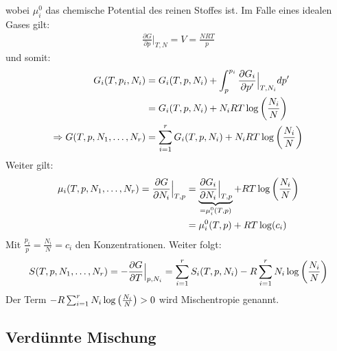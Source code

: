 wobei $\mu_i^0$ das chemische Potential des reinen Stoffes ist.
Im Falle eines idealen Gases gilt:
\begin{align*}
    \frac{\partial G}{\partial p} \Big|_{T,N} = V = \frac{N R T}{p}
\end{align*}
und somit:
\begin{align*}
    G_i(T,p_i,N_i) &= G_i (T,p,N_i) + \int_{p}^{p_i} \frac{\partial G_i}{\partial p'} \Big|_{T,N_i} dp'
    \\
    &= G_i (T,p,N_i) + N_i R T \log \left( \frac{N_i}{N} \right)
    \\
    \Rightarrow
    G(T,p,N_1,\dots,N_r) &= \sum_{i=1}^r G_i (T,p,N_i) + N_i R T \log \left( \frac{N_i}{N} \right)
\end{align*}
Weiter gilt:
\begin{align*}
    \mu_i(T,p,N_1,\dots,N_r) = \frac{\partial G}{\partial N_i} \Big|_{T,p}
    &= \underbrace{\frac{\partial G_i}{\partial N_i} \Big|_{T,p}}_{=\mu_i^0 (T,p)}
        + R T \log \left( \frac{N_i}{N} \right)
    \\
    &= \mu_i^0 (T,p) + R T \log(c_i)
\end{align*}
Mit $\frac{p_i}{p} = \frac{N_i}{N} = c_i$ den Konzentrationen.
Weiter folgt:
\begin{align*}
    S(T,p,N_1,\dots,N_r) = - \frac{\partial G}{\partial T} \Big|_{p,N_i}
    = \sum_{i=1}^r S_i(T,p,N_i) - R \sum_{i=1}^r N_i \log \left( \frac{N_i}{N} \right)
\end{align*}
Der Term $- R \sum_{i=1}^r N_i \log \left( \frac{N_i}{N} \right) > 0$ wird
Mischentropie genannt.

\subsection{Verdünnte Mischung}

